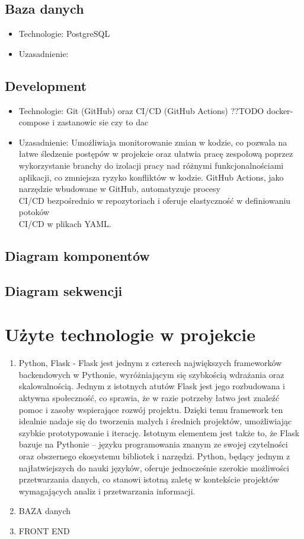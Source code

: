 \documentclass[12pt,titlepage]{article}
\begin{document}
\subsection{Baza danych}
\begin{itemize}
    \item Technologie: PostgreSQL
    \item Uzasadnienie: 
\end{itemize}

\subsection{Development}
\begin{itemize}
    \item Technologie: Git (GitHub) oraz CI/CD (GitHub Actions) ??TODO docker-compose i zastanowic sie czy to dac
    \item Uzasadnienie: Umożliwiaja monitorowanie zmian w kodzie, co pozwala na łatwe śledzenie postępów w projekcie oraz ułatwia pracę zespołową poprzez wykorzystanie branchy do izolacji pracy nad różnymi funkcjonalnościami aplikacji, co zmniejsza ryzyko konfliktów w kodzie. GitHub Actions, jako narzędzie wbudowane w GitHub, automatyzuje procesy \\ CI/CD bezpośrednio w repozytoriach i oferuje elastyczność w definiowaniu potoków \\ CI/CD w plikach YAML. 
\end{itemize}


\subsection{Diagram komponentów}
\subsection{Diagram sekwencji}
\section{Użyte technologie w projekcie}
\begin{enumerate}
    \item Python, Flask - Flask jest jednym z czterech największych frameworków backendowych w Pythonie, wyróżniającym się szybkością wdrażania oraz skalowalnością. Jednym z istotnych atutów Flask jest jego rozbudowana i aktywna społeczność, co sprawia, że w razie potrzeby łatwo jest znaleźć pomoc i zasoby wspierające rozwój projektu. Dzięki temu framework ten idealnie nadaje się do tworzenia małych i średnich projektów, umożliwiając szybkie prototypowanie i iterację. Istotnym elementem jest także to, że Flask bazuje na Pythonie – języku programowania znanym ze swojej czytelności oraz obszernego ekosystemu bibliotek i narzędzi. Python, będący jednym z najłatwiejszych do nauki języków, oferuje jednocześnie szerokie możliwości przetwarzania danych, co stanowi istotną zaletę w kontekście projektów wymagających analiz i przetwarzania informacji.
    \item BAZA danych
    \item FRONT END
\end{enumerate}
\end{document}
